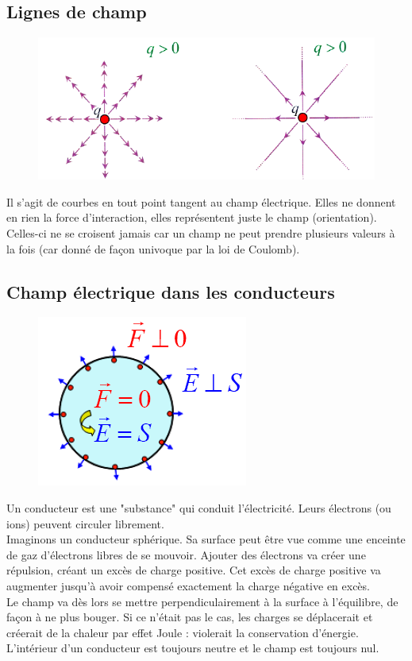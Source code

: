 \documentclass	[11pt, a4paper, openany]{book}
\begin{document}
\subsection{Lignes de champ}
\begin{figure}
	\includegraphics[scale=0.34]{es/image4.png}
\end{figure}
Il s'agit de courbes en tout point tangent au champ électrique. Elles ne donnent en rien la force d'interaction, elles représentent juste le champ (orientation).\\

Celles-ci ne se croisent jamais car un champ ne peut prendre plusieurs valeurs à la fois (car donné de façon univoque par la loi de Coulomb).

\subsection{Champ électrique dans les conducteurs}
\begin{figure}
	\includegraphics[scale=0.34]{es/image5.png}
\end{figure}
Un conducteur est une "substance" qui conduit l'électricité. Leurs électrons (ou ions) peuvent circuler librement.\\
Imaginons un conducteur sphérique. Sa surface peut être vue comme une enceinte de gaz d'électrons libres de se mouvoir. Ajouter des électrons va créer une répulsion, créant un excès de charge positive. Cet excès de charge positive va augmenter jusqu'à avoir compensé exactement la charge négative en excès.\\
Le champ va dès lors se mettre perpendiculairement à la surface à l'équilibre, de façon à ne plus bouger. Si ce n'était pas le cas, les charges se déplacerait et créerait de la chaleur par effet Joule : violerait la conservation d'énergie.\\
L'intérieur d'un conducteur est toujours neutre et le champ est toujours nul.
\end{document}
